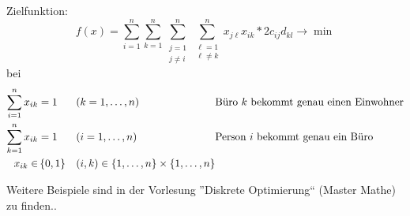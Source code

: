 Zielfunktion:
\begin{equation*}
	f(x) = \sum_{i=1}^n \sum_{k=1}^n \sum\limits_{\substack{j=1 \\ j \neq i}}^n \sum\limits_{\substack{\ell =1 \\ \ell \neq k}}^n x_{j \ell} x_{i k} * 2c_{ij} d_{kl} \to \min
\end{equation*}
bei
\begin{equation*}
	\begin{alignedat}{3}
	\sum_{i=1}^n x_{ik} &= 1 \quad &&(k = 1, \dots, n) \quad &&\text{Büro $k$ bekommt genau einen Einwohner} \\
	\sum_{k=1}^n x_{ik} &= 1 &&(i = 1, \dots, n) &&\text{Person $i$ bekommt genau ein Büro} \\
	x_{ik} \in &\left\{ 0,1 \right\} \quad &&(i,k) \in \left\{ 1, \dots , n \right\} \times \left\{ 1, \dots , n \right\} &&
	\end{alignedat}
\end{equation*}

Weitere Beispiele sind in der Vorlesung ''Diskrete Optimierung`` (Master Mathe) zu finden..
